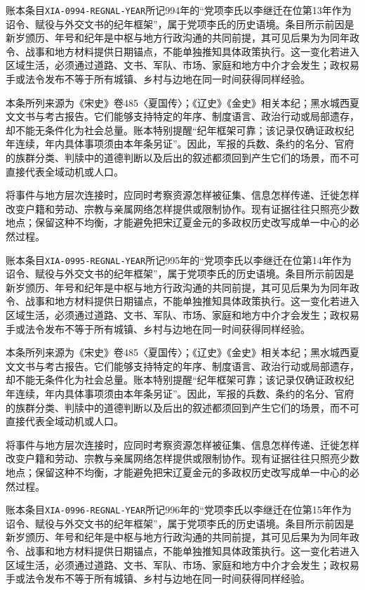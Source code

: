 账本条目\texttt{XIA-0994-REGNAL-YEAR}所记994年的“党项李氏以李继迁在位第13年作为诏令、赋役与外交文书的纪年框架”，属于党项李氏的历史语境。条目所示前因是新岁颁历、年号和纪年是中枢与地方行政沟通的共同前提，其可见后果为为同年政令、战事和地方材料提供日期锚点，不能单独推知具体政策执行。这一变化若进入区域生活，必须通过道路、文书、军队、市场、家庭和地方中介才会发生；政权易手或法令发布不等于所有城镇、乡村与边地在同一时间获得同样经验。

本条所列来源为《宋史》卷485〈夏国传〉；《辽史》《金史》相关本纪；黑水城西夏文文书与考古报告。它们能够支持特定的年序、制度语言、政治行动或局部遗存，却不能无条件化为社会总量。账本特别提醒“纪年框架可靠；该记录仅确证政权纪年连续，年内具体事项须由本年条另证”。因此，军报的兵数、条约的名分、官府的族群分类、判牍中的道德判断以及后出的叙述都须回到产生它们的场景，而不可直接代表全域动机或人口。

将事件与地方层次连接时，应同时考察资源怎样被征集、信息怎样传递、迁徙怎样改变户籍和劳动、宗教与亲属网络怎样提供或限制协作。现有证据往往只照亮少数地点；保留这种不均衡，才能避免把宋辽夏金元的多政权历史改写成单一中心的必然过程。

账本条目\texttt{XIA-0995-REGNAL-YEAR}所记995年的“党项李氏以李继迁在位第14年作为诏令、赋役与外交文书的纪年框架”，属于党项李氏的历史语境。条目所示前因是新岁颁历、年号和纪年是中枢与地方行政沟通的共同前提，其可见后果为为同年政令、战事和地方材料提供日期锚点，不能单独推知具体政策执行。这一变化若进入区域生活，必须通过道路、文书、军队、市场、家庭和地方中介才会发生；政权易手或法令发布不等于所有城镇、乡村与边地在同一时间获得同样经验。

本条所列来源为《宋史》卷485〈夏国传〉；《辽史》《金史》相关本纪；黑水城西夏文文书与考古报告。它们能够支持特定的年序、制度语言、政治行动或局部遗存，却不能无条件化为社会总量。账本特别提醒“纪年框架可靠；该记录仅确证政权纪年连续，年内具体事项须由本年条另证”。因此，军报的兵数、条约的名分、官府的族群分类、判牍中的道德判断以及后出的叙述都须回到产生它们的场景，而不可直接代表全域动机或人口。

将事件与地方层次连接时，应同时考察资源怎样被征集、信息怎样传递、迁徙怎样改变户籍和劳动、宗教与亲属网络怎样提供或限制协作。现有证据往往只照亮少数地点；保留这种不均衡，才能避免把宋辽夏金元的多政权历史改写成单一中心的必然过程。

账本条目\texttt{XIA-0996-REGNAL-YEAR}所记996年的“党项李氏以李继迁在位第15年作为诏令、赋役与外交文书的纪年框架”，属于党项李氏的历史语境。条目所示前因是新岁颁历、年号和纪年是中枢与地方行政沟通的共同前提，其可见后果为为同年政令、战事和地方材料提供日期锚点，不能单独推知具体政策执行。这一变化若进入区域生活，必须通过道路、文书、军队、市场、家庭和地方中介才会发生；政权易手或法令发布不等于所有城镇、乡村与边地在同一时间获得同样经验。

